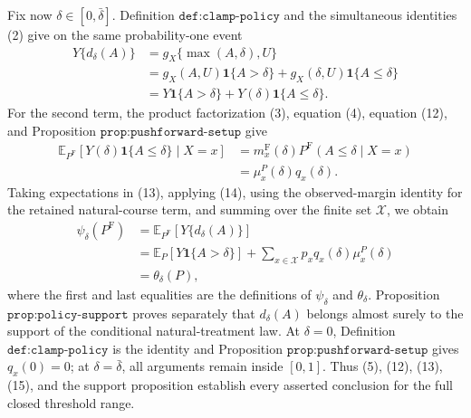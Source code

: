 Fix now \(\delta\in[0,\bar\delta]\). Definition \(\texttt{def:clamp-policy}\) and the simultaneous identities (2) give on the same probability-one event
\[
\begin{aligned}
 Y\{d_\delta(A)\}
 &=g_X\{\max(A,\delta),U\}\\
 &=g_X(A,U)\mathbf 1\{A>\delta\}
   +g_X(\delta,U)\mathbf 1\{A\leq\delta\}\\
 &=Y\mathbf 1\{A>\delta\}
   +Y(\delta)\mathbf 1\{A\leq\delta\}.
\end{aligned}
\tag{13}
\]
For the second term, the product factorization (3), equation (4), equation (12), and Proposition \(\texttt{prop:pushforward-setup}\) give
\[
\begin{aligned}
 \mathbb E_{P^{\mathrm F}}[Y(\delta)\mathbf 1\{A\leq\delta\}\mid X=x]
 &=m_x^{\mathrm F}(\delta)
   P^{\mathrm F}(A\leq\delta\mid X=x)\\
 &=\mu_x^P(\delta)q_x(\delta).
\end{aligned}
\tag{14}
\]
Taking expectations in (13), applying (14), using the observed-margin identity for the retained natural-course term, and summing over the finite set \(\mathcal X\), we obtain
\[
\begin{aligned}
 \psi_\delta(P^{\mathrm F})
 &=\mathbb E_{P^{\mathrm F}}[Y\{d_\delta(A)\}]\\
 &=\mathbb E_P[Y\mathbf 1\{A>\delta\}]
   +\sum_{x\in\mathcal X}p_xq_x(\delta)\mu_x^P(\delta)\\
 &=\theta_\delta(P),
\end{aligned}
\tag{15}
\]
where the first and last equalities are the definitions of \(\psi_\delta\) and \(\theta_\delta\). Proposition \(\texttt{prop:policy-support}\) proves separately that \(d_\delta(A)\) belongs almost surely to the support of the conditional natural-treatment law. At \(\delta=0\), Definition \(\texttt{def:clamp-policy}\) is the identity and Proposition \(\texttt{prop:pushforward-setup}\) gives \(q_x(0)=0\); at \(\delta=\bar\delta\), all arguments remain inside \([0,1]\). Thus (5), (12), (13), (15), and the support proposition establish every asserted conclusion for the full closed threshold range.